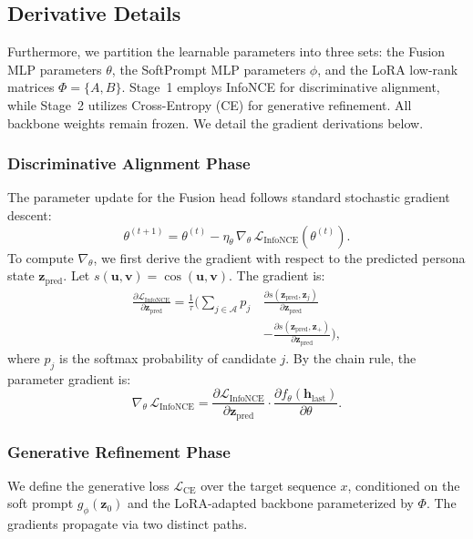 \subsection{Derivative Details} \label{sec:derivation}
Furthermore, we partition the learnable parameters into three sets: the Fusion MLP parameters $\theta$, the SoftPrompt MLP parameters $\phi$, and the LoRA low-rank matrices $\Phi=\{A,B\}$. Stage~1 employs InfoNCE for discriminative alignment, while Stage~2 utilizes Cross-Entropy (CE) for generative refinement. All backbone weights remain frozen. We detail the gradient derivations below.


\subsubsection{Discriminative Alignment Phase}
The parameter update for the Fusion head follows standard stochastic gradient descent:
\begin{equation}
    \theta^{(t+1)} = \theta^{(t)} - \eta_{\theta}\,\nabla_{\theta}\,\mathcal{L}_{\mathrm{InfoNCE}}(\theta^{(t)}).
    \label{eq:12}
\end{equation}
To compute $\nabla_{\theta}$, we first derive the gradient with respect to the predicted persona state $\mathbf{z}_{\text{pred}}$. Let $s(\mathbf{u}, \mathbf{v}) = \cos(\mathbf{u}, \mathbf{v})$. The gradient is:
\begin{equation}
\label{eq:13}
\begin{split}
    \frac{\partial \mathcal{L}_{\mathrm{InfoNCE}}}{\partial \mathbf{z}_{\text{pred}}} = \frac{1}{\tau} \Bigg( \sum_{j \in \mathcal{A}} p_j \, &\frac{\partial s(\mathbf{z}_{\text{pred}}, \mathbf{z}_j)}{\partial \mathbf{z}_{\text{pred}}} \\
    &- \frac{\partial s(\mathbf{z}_{\text{pred}}, \mathbf{z}_+)}{\partial \mathbf{z}_{\text{pred}}} \Bigg),
\end{split}
\end{equation}
where $p_j$ is the softmax probability of candidate $j$. By the chain rule, the parameter gradient is:
\begin{equation}
    \nabla_{\theta}\,\mathcal{L}_{\mathrm{InfoNCE}} = \frac{\partial \mathcal{L}_{\mathrm{InfoNCE}}}{\partial \mathbf{z}_{\text{pred}}} \cdot \frac{\partial f_{\theta}(\mathbf{h}_{\text{last}})}{\partial \theta}.
    \label{eq:14}
\end{equation}






\subsubsection{Generative Refinement Phase}  
We define the generative loss $\mathcal{L}_{\mathrm{CE}}$ over the target sequence $x$, conditioned on the soft prompt $g_\phi(\mathbf{z}_0)$ and the LoRA-adapted backbone parameterized by $\Phi$. The gradients propagate via two distinct paths.

